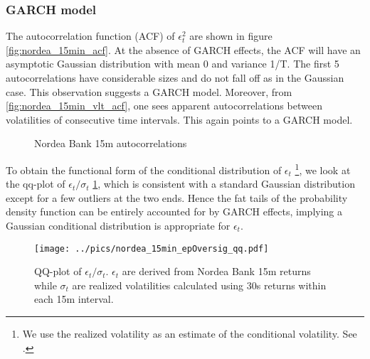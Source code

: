 \documentclass{book}
\begin{document}
\subsubsection{GARCH model}
The autocorrelation function (ACF) of $\epsilon_t^2$ are shown in figure
\ref{fig:nordea_15min_acf}. At the absence of GARCH effects, the ACF
will have an asymptotic Gaussian distribution with mean 0 and variance
1/T. The first 5 autocorrelations have considerable sizes and do not
fall off as in the Gaussian case. This observation suggests a GARCH
model. Moreover, from \ref{fig:nordea_15min_vlt_acf}, one sees
apparent autocorrelations between volatilities of consecutive time
intervals. This again points to a GARCH model.
\begin{figure}[htb!]
  \centering
  \caption{Nordea Bank 15m autocorrelations}
\end{figure}

To obtain the functional form of the conditional distribution of
$\epsilon_t$ \footnote{We use the realized volatility as an estimate of the
conditional volatility. See \cite{Andersen03}.}, we look at the
qq-plot of $\epsilon_t/\sigma_t$ \ref{fig:nordea_15min_epOversig_qq},
which is consistent with a standard Gaussian distribution except for a
few outliers at the two ends. Hence the fat tails of the probability
density function can be entirely accounted for by GARCH effects,
implying a Gaussian conditional distribution is appropriate for $\epsilon_t$.
\begin{figure}[htb!]
  \centering
    \texttt{[image: ../pics/nordea\_15min\_epOversig\_qq.pdf]}
  \caption{QQ-plot of $\epsilon_t / \sigma_t$. $\epsilon_t$ are
    derived from Nordea Bank 15m returns while $\sigma_t$ are realized
    volatilities calculated using 30s returns within each 15m
    interval.}
  \label{fig:nordea_15min_epOversig_qq}
\end{figure}
\end{document}
